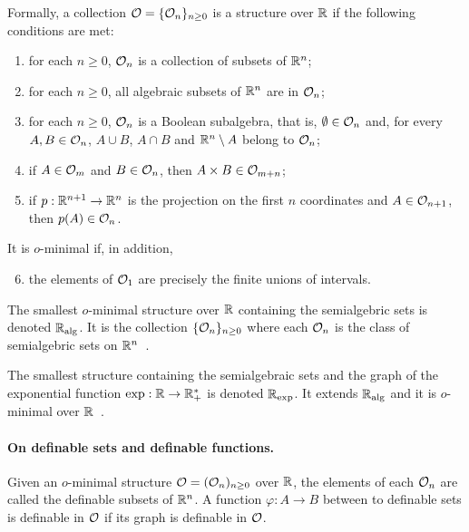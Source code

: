 Formally, a collection $\mathcal{O} = \{\mathcal{O}_{n}\}_{n  \geq 0}$ is a structure over
$\mathbb{R}$ if the following conditions are met:
\begin{enumerate}[label=(\alph*)]
\item  for  each  $n \geq  0$,  $\mathcal{O}_{n}$  is  a  collection of  subsets  of
  $\mathbb{R}^{n}$;
\item for each $n \geq 0$, all algebraic subsets of $\mathbb{R}^n$ are in $\mathcal{O}_n$;
\item  for each  $n  \geq 0$,  $\mathcal{O}_n$  is a  Boolean  subalgebra, that  is,
  $\emptyset \in  \mathcal{O}_{n}$ and,  for every $A,B  \in \mathcal{O}_{n}$,  $A\cup B$,
  $A \cap B$ and $\mathbb{R}^{n} \setminus A$ belong to $\mathcal{O}_{n}$;
\item if $A\in \mathcal{O}_m$ and $B\in \mathcal{O}_n$, then $A\times B \in \mathcal{O}_{m+n}$;
\item if $p: \mathbb{R}^{n+1} \rightarrow \mathbb{R}^n$ is the projection on the first $n$
  coordinates and $A \in \mathcal{O}_{n+1}$, then $p(A) \in \mathcal{O}_n$.
\end{enumerate}
It is $o$-minimal if, in addition,
\begin{enumerate}[label=(\alph*)]
  \setcounter{enumi}{5}
\item the elements of $\mathcal{O}_1$ are precisely the finite unions of intervals.
\end{enumerate}

The  smallest $o$-minimal  structure over  $\mathbb{R}$ containing  the semialgebric
sets    is    denoted    $\mathbb{R}_{\text{alg}}$.    It    is    the    collection
$\{\mathcal{O}_{n}\}_{n \geq 0}$ where each $\mathcal{O}_{n}$ is the class of semialgebric
sets on $\mathbb{R}^{n}$~\cite{benedetti90,bochnak98}.

The smallest structure containing the semialgebraic  sets and the graph of the
exponential  function   $\exp:  \mathbb{R}  \rightarrow  \mathbb{R}_{+}^{*}$   is  denoted
$\mathbb{R}_{\exp}$.   It extends  $\mathbb{R}_{\text{alg}}$  and it  is $o$-minimal  over
$\mathbb{R}$~\cite{Wilkie96modelcompleteness}.


\paragraph{On definable sets and definable functions.}

Given an $o$-minimal  structure $\mathcal{O} = (\mathcal{O}_{n})_{n \geq  0}$ over $\mathbb{R}$,
the  elements  of  each  $\mathcal{O}_{n}$  are  called  the  definable  subsets  of
$\mathbb{R}^{n}$.   A  function $\varphi:A  \to  B$  between  to definable  sets  is
definable in $\mathcal{O}$ if its graph is definable in $\mathcal{O}$.

